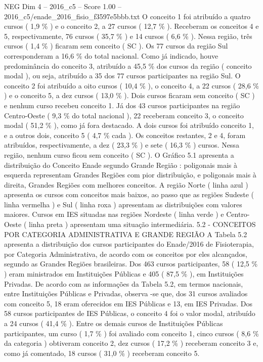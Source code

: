 \begin{textsample}{NEG Dim 4 – 2016\_c5 – Score 1.00 – 2016\_c5/enade\_2016\_fisio\_f3597e5bbb.txt}
O conceito 1 foi atribuído a quatro cursos ( 1,9 \% ) e o conceito 2, a 27 cursos ( 12,7 \% ).
Receberam os conceitos 4 e 5, respectivamente, 76 cursos ( 35,7 \% ) e 14 cursos ( 6,6 \% ).
Nessa região, três cursos ( 1,4 \% ) ficaram sem conceito ( SC ).
Os 77 cursos da região Sul corresponderam a 16,6 \% do total nacional.
Como já indicado, houve predominância do conceito 3, atribuído a 45,5 \% dos cursos da região ( conceito modal ), ou seja, atribuído a 35 dos 77 cursos participantes na região Sul.
O conceito 2 foi atribuído a oito cursos ( 10,4 \% ), o conceito 4, a 22 cursos ( 28,6 \% ) e o conceito 5, a dez cursos ( 13,0 \% ).
Dois cursos ficaram sem conceito ( SC ) e nenhum curso recebeu conceito 1.
Já dos 43 cursos participantes na região Centro-Oeste ( 9,3 \% do total nacional ), 22 receberam conceito 3, o conceito modal ( 51,2 \% ), como já fora destacado.
A dois cursos foi atribuído conceito 1, e a outros dois, conceito 5 ( 4,7 \% cada ).
Os conceitos restantes, 2 e 4, foram atribuídos, respectivamente, a dez ( 23,3 \% ) e sete ( 16,3 \% ) cursos.
Nessa região, nenhum curso ficou sem conceito ( SC ).
O Gráfico 5.1 apresenta a distribuição do Conceito Enade segundo Grande Região : poligonais mais à esquerda representam Grandes Regiões com pior distribuição, e poligonais mais à direita, Grandes Regiões com melhores conceitos.
A região Norte ( linha azul ) apresenta os cursos com conceitos mais baixos, ao passo que as regiões Sudeste ( linha vermelha ) e Sul ( linha roxa ) apresentam as distribuições com valores maiores.
Cursos em IES situadas nas regiões Nordeste ( linha verde ) e Centro-Oeste ( linha preta ) apresentam uma situação intermediária. 5.2 - CONCEITOS POR CATEGORIA ADMINISTRATIVA E GRANDE REGIÃO A Tabela 5.2 apresenta a distribuição dos cursos participantes do Enade/2016 de Fisioterapia, por Categoria Administrativa, de acordo com os conceitos por eles alcançados, segundo as Grandes Regiões brasileiras.
Dos 463 cursos participantes, 58 ( 12,5 \% ) eram ministrados em Instituições Públicas e 405 ( 87,5 \% ), em Instituições Privadas.
De acordo com as informações da Tabela 5.2, em termos nacionais, entre Instituições Públicas e Privadas, observa -se que, dos 31 cursos avaliados com conceito 5, 18 eram oferecidos em IES Públicas e 13, em IES Privadas.
Dos 58 cursos participantes de IES Públicas, o conceito 4 foi o valor modal, atribuído a 24 cursos ( 41,4 \% ).
Entre os demais cursos de Instituições Públicas participantes, um curso ( 1,7 \% ) foi avaliado com conceito 1, cinco cursos ( 8,6 \% da categoria ) obtiveram conceito 2, dez cursos ( 17,2 \% ) receberam conceito 3 e, como já comentado, 18 cursos ( 31,0 \% ) receberam conceito 5.

\end{textsample}
